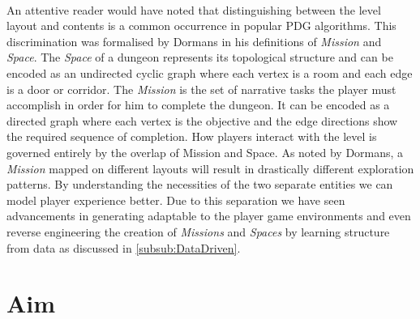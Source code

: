 \documentclass{UoYCSproject}
\begin{document}
\paragraph{}
An attentive reader would have noted that distinguishing between the level layout and contents is a common occurrence in popular PDG algorithms. This discrimination was formalised by Dormans \parencite{DormansMS} in his definitions of \textit{Mission} and \textit{Space}.
The \textit{Space} of a dungeon represents its topological structure and can be encoded as an undirected cyclic graph where each vertex is a room and each edge is a door or corridor. The \textit{Mission} is the set of narrative tasks the player must accomplish in order for him to complete the dungeon. It can be encoded as a directed graph where each vertex is the objective and the edge directions show the required sequence of completion. How players interact with the level is governed entirely by the overlap of Mission and Space. As noted by Dormans, a \textit{Mission} mapped on different layouts will result in drastically different exploration patterns. By understanding the necessities of the two separate entities we can model player experience better. Due to this separation we have seen advancements in generating adaptable to the player game environments \parencite{DormansAE} and even reverse engineering the creation of \textit{Missions} and \textit{Spaces} by learning structure from data as discussed in \ref{subsub:DataDriven}.

\section{Aim}
\label{sec:Aim}
\end{document}
